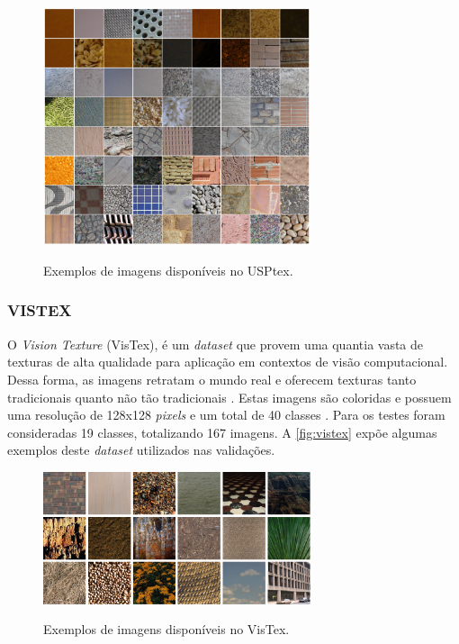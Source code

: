 \begin{figure}[!h]
    \centering
    \caption{Exemplos de imagens disponíveis no USPtex.}
    \includegraphics[width=0.7\textwidth]{./dados/figuras/USPtex.png}
    \label{fig:usptex}
\end{figure}

\subsubsection{VISTEX}
\label{subsubsec:vistex}

\par O \textit{Vision Texture} (VisTex), é um \textit{dataset} que provem uma quantia vasta de texturas de alta qualidade para aplicação em contextos de visão computacional. Dessa forma, as imagens retratam o mundo real e oferecem texturas tanto tradicionais quanto não tão tradicionais \cite{vistex}. Estas imagens são coloridas e possuem uma resolução de 128x128 \textit{pixels} e um total de 40 classes \cite{fekri2019new}. Para os testes foram consideradas 19 classes, totalizando 167 imagens. A \autoref{fig:vistex} expõe algumas exemplos deste \textit{dataset} utilizados nas validações.

\begin{figure}[!h]
    \centering
    \caption{Exemplos de imagens disponíveis no VisTex.}
    \includegraphics[width=0.7\textwidth]{./dados/figuras/vistex.png}
    \label{fig:vistex}
\end{figure}


